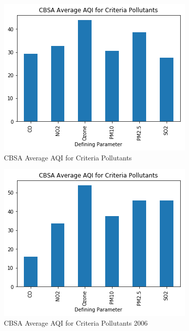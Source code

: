\documentclass[sigconf]{acmart}
\begin{document}
\begin{figure}[htb]
\includegraphics[width=1.0\columnwidth]{images/averageaqi2016.png}
  \caption{CBSA Average AQI for Criteria Pollutants}
  \label{Average CBSA AQI 2016}
\end{figure}

\begin{figure}[htb]
\includegraphics[width=1.0\columnwidth]{images/averageaqi2006.png}
  \caption{CBSA Average AQI for Criteria Pollutants 2006}
  \label{Average CBSA AQI 2006}
\end{figure}
\end{document}
